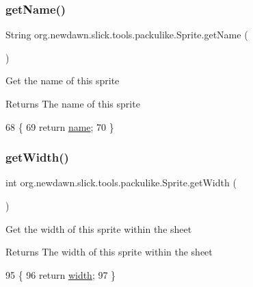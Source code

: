 \subsubsection{\texorpdfstring{get\+Name()}{getName()}}
{\footnotesize\ttfamily String org.\+newdawn.\+slick.\+tools.\+packulike.\+Sprite.\+get\+Name (\begin{DoxyParamCaption}{ }\end{DoxyParamCaption})\hspace{0.3cm}{\ttfamily [inline]}}

Get the name of this sprite

\begin{DoxyReturn}{Returns}
The name of this sprite 
\end{DoxyReturn}

\begin{DoxyCode}
68                             \{
69         \textcolor{keywordflow}{return} \mbox{\hyperlink{classorg_1_1newdawn_1_1slick_1_1tools_1_1packulike_1_1_sprite_a8cad2e7ed5b25766e5b16d76a96ce831}{name}};
70     \}
\end{DoxyCode}
\mbox{\label{classorg_1_1newdawn_1_1slick_1_1tools_1_1packulike_1_1_sprite_a09b39bcf1788b4a2e3d9e2ce12cb0d7a}} 
\subsubsection{\texorpdfstring{get\+Width()}{getWidth()}}
{\footnotesize\ttfamily int org.\+newdawn.\+slick.\+tools.\+packulike.\+Sprite.\+get\+Width (\begin{DoxyParamCaption}{ }\end{DoxyParamCaption})\hspace{0.3cm}{\ttfamily [inline]}}

Get the width of this sprite within the sheet

\begin{DoxyReturn}{Returns}
The width of this sprite within the sheet 
\end{DoxyReturn}

\begin{DoxyCode}
95                           \{
96         \textcolor{keywordflow}{return} \mbox{\hyperlink{classorg_1_1newdawn_1_1slick_1_1tools_1_1packulike_1_1_sprite_a4246c9fcd258ce9268d69532b384c977}{width}};
97     \}
\end{DoxyCode}
\mbox{\label{classorg_1_1newdawn_1_1slick_1_1tools_1_1packulike_1_1_sprite_a45f6274c3c05f88820b9bbdfcba8e902}} 

